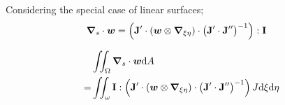 \documentclass[a4paper,11pt]{article}
\renewcommand{\to}[1]{\text{\boldmath $#1$}} %
\newcommand{\ts}[1]{\text{\boldmath $\mathrm{#1}$}} %
\newcommand{\intd}[1]{\mathrm{d}#1}
\begin{document}
Considering the special case of linear surfaces;
\begin{align}
  \to\nabla_s\cdot\to w &= \left(\ts J'\cdot(\to w\otimes\to\nabla_{\xi\eta})\cdot \left(\ts J'\cdot\ts J''\right)^{-1}\right): \ts I
\end{align}

\begin{align}
 &\iint_\Omega\to \nabla_s\cdot\to w\intd A\\
=&\iint_\omega \ts I:\left(\ts J'\cdot(\to w\otimes\to\nabla_{\xi\eta})\cdot \left(\ts J'\cdot\ts J''\right)^{-1}\right)J\intd\xi\intd\eta
\end{align}
\end{document}
